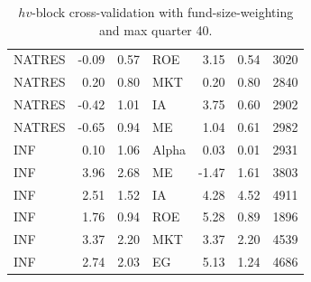 \documentclass[12pt]{article}
\begin{document}
\begin{table}[ht]
\begin{tabular}{lrrlrrl}
		NATRES & -0.09 & 0.57 & ROE & 3.15 & 0.54 & 3020 \\ 
		NATRES & 0.20 & 0.80 & MKT & 0.20 & 0.80 & 2840 \\ 
		NATRES & -0.42 & 1.01 & IA & 3.75 & 0.60 & 2902 \\ 
		NATRES & -0.65 & 0.94 & ME & 1.04 & 0.61 & 2982 \\ 
		INF & 0.10 & 1.06 & Alpha & 0.03 & 0.01 & 2931 \\ 
		INF & 3.96 & 2.68 & ME & -1.47 & 1.61 & 3803 \\ 
		INF & 2.51 & 1.52 & IA & 4.28 & 4.52 & 4911 \\ 
		INF & 1.76 & 0.94 & ROE & 5.28 & 0.89 & 1896 \\ 
		INF & 3.37 & 2.20 & MKT & 3.37 & 2.20 & 4539 \\ 
		INF & 2.74 & 2.03 & EG & 5.13 & 1.24 & 4686 \\ 
		\hline
	\end{tabular}
	\caption{$hv$-block cross-validation with fund-size-weighting and max quarter 40.} 
	\label{tab:cv_40_fw}
\end{table}
\end{document}

